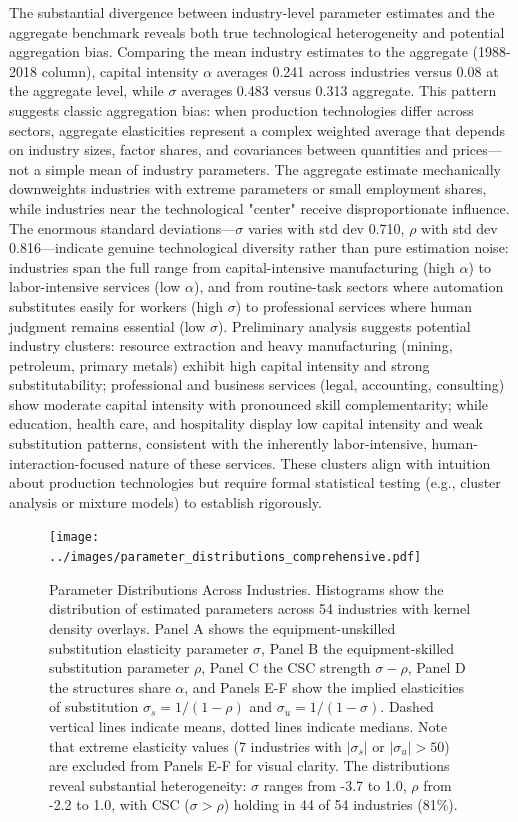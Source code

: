 \documentclass[12pt]{article}
\begin{document}
The substantial divergence between industry-level parameter estimates and the aggregate benchmark reveals both true technological heterogeneity and potential aggregation bias. Comparing the mean industry estimates to the aggregate (1988-2018 column), capital intensity $\alpha$ averages 0.241 across industries versus 0.08 at the aggregate level, while $\sigma$ averages 0.483 versus 0.313 aggregate. This pattern suggests classic aggregation bias: when production technologies differ across sectors, aggregate elasticities represent a complex weighted average that depends on industry sizes, factor shares, and covariances between quantities and prices---not a simple mean of industry parameters. The aggregate estimate mechanically downweights industries with extreme parameters or small employment shares, while industries near the technological "center" receive disproportionate influence. The enormous standard deviations---$\sigma$ varies with std dev 0.710, $\rho$ with std dev 0.816---indicate genuine technological diversity rather than pure estimation noise: industries span the full range from capital-intensive manufacturing (high $\alpha$) to labor-intensive services (low $\alpha$), and from routine-task sectors where automation substitutes easily for workers (high $\sigma$) to professional services where human judgment remains essential (low $\sigma$). Preliminary analysis suggests potential industry clusters: resource extraction and heavy manufacturing (mining, petroleum, primary metals) exhibit high capital intensity and strong substitutability; professional and business services (legal, accounting, consulting) show moderate capital intensity with pronounced skill complementarity; while education, health care, and hospitality display low capital intensity and weak substitution patterns, consistent with the inherently labor-intensive, human-interaction-focused nature of these services. These clusters align with intuition about production technologies but require formal statistical testing (e.g., cluster analysis or mixture models) to establish rigorously.

\begin{figure}[H]
 \centering
 \texttt{[image: ../images/parameter\_distributions\_comprehensive.pdf]}
 \caption{\label{fig:parameter_distributions} Parameter Distributions Across Industries. Histograms show the distribution of estimated parameters across 54 industries with kernel density overlays. Panel A shows the equipment-unskilled substitution elasticity parameter $\sigma$, Panel B the equipment-skilled substitution parameter $\rho$, Panel C the CSC strength $\sigma - \rho$, Panel D the structures share $\alpha$, and Panels E-F show the implied elasticities of substitution $\sigma_s = 1/(1-\rho)$ and $\sigma_u = 1/(1-\sigma)$. Dashed vertical lines indicate means, dotted lines indicate medians. Note that extreme elasticity values (7 industries with $|\sigma_s|$ or $|\sigma_u| > 50$) are excluded from Panels E-F for visual clarity. The distributions reveal substantial heterogeneity: $\sigma$ ranges from -3.7 to 1.0, $\rho$ from -2.2 to 1.0, with CSC ($\sigma > \rho$) holding in 44 of 54 industries (81\%).}
\end{figure}
\end{document}
